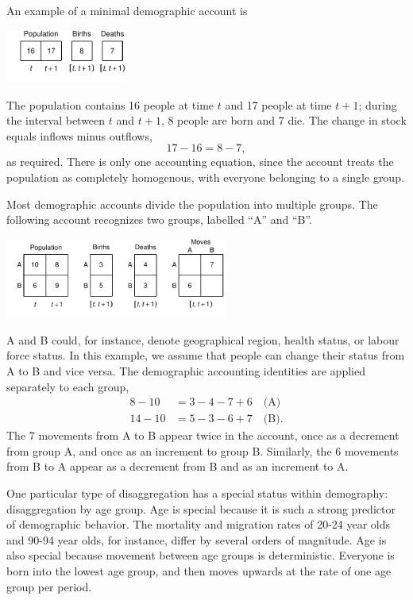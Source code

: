 \documentclass[USenglish]{article}
\begin{document}
An example of a minimal demographic account is
\begin{center}
\includegraphics[width=0.3\textwidth]{figures_accounts/fig_account_noage.pdf}
\end{center}
The population contains 16 people at time $t$ and 17 people at time $t+1$; during the interval between $t$ and $t+1$, 8 people are born and 7 die. The change in stock equals inflows minus outflows,
\begin{equation*}
  17 - 16 = 8 - 7,
\end{equation*}
as required. There is only one accounting equation, since the account treats the population as completely homogenous, with everyone belonging to a single group.

Most demographic accounts divide the population into multiple groups. The following account recognizes two groups, labelled ``A'' and ``B''. 
\begin{center}
\includegraphics[width=0.55\textwidth]{figures_accounts/fig_account_region.pdf}
\end{center}
A and B could, for instance, denote geographical region, health status, or labour force status. In this example, we assume that people can change their status from A to B and vice versa. The demographic accounting identities are applied separately to each group,
\begin{align*}
    8 - 10 & = 3 - 4 - 7 + 6 \quad \text{(A)}\\
    14 - 10 & = 5 - 3 - 6 + 7 \quad \text{(B)}.
\end{align*}
The 7 movements from A to B appear twice in the account, once as a decrement from group A, and once as an increment to group B. Similarly, the 6 movements from B to A appear as a decrement from B and as an increment to A.

One particular type of disaggregation has a special status within demography: disaggregation by age group. Age is special because it is such a strong predictor of demographic behavior. The mortality and migration rates of 20-24 year olds and 90-94 year olds, for instance, differ by several orders of magnitude. Age is also special because movement between age groups is deterministic. Everyone is born into the lowest age group, and then moves upwards at the rate of one age group per period.
\end{document}
